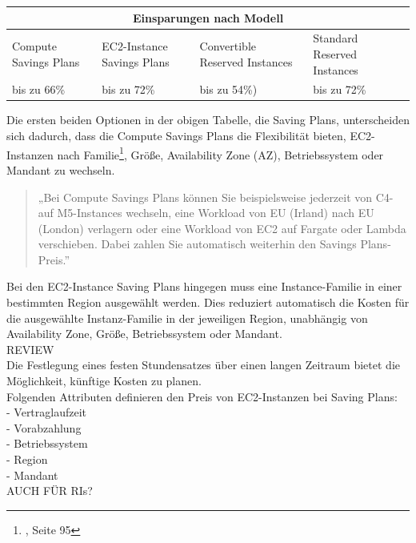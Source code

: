 \begin{table}[h!]
    \centering
    \begin{tabular}{ |p{3cm}||p{3cm}|p{3.6cm}|p{3.6cm}|  }
        \hline
        \multicolumn{4}{|c|}{Einsparungen nach Modell}                                                                    \\
        \hline
        Compute Savings Plans & EC2-Instance Savings Plans & Convertible Reserved Instances & Standard Reserved Instances \\
        \hline
        bis zu 66\%           & bis zu 72\%
                              & bis zu 54\%)               & bis zu 72\%
        \\
        \hline
    \end{tabular}
    {\cite{AMZ07,AMZ11}}
\end{table}
Die ersten beiden Optionen in der obigen Tabelle, die Saving Plans, unterscheiden sich dadurch, dass die Compute Savings Plans die Flexibilität bieten, EC2-Instanzen nach Familie\footnote{\cite{AWS1}, Seite 95}, Größe, Availability Zone (AZ), Betriebssystem oder Mandant zu wechseln.
\begin{quote}
    „Bei Compute Savings Plans können Sie beispielsweise jederzeit von C4- auf M5-Instances wechseln, eine Workload von EU (Irland) nach EU (London) verlagern oder eine Workload von EC2 auf Fargate oder Lambda verschieben. Dabei zahlen Sie automatisch weiterhin den Savings Plans-Preis.”
    {\cite{AMZ11}}
\end{quote}

Bei den EC2-Instance Saving Plans hingegen muss eine Instance-Familie in einer bestimmten Region ausgewählt werden.  Dies reduziert automatisch die Kosten für die ausgewählte Instanz-Familie in der jeweiligen Region, unabhängig von Availability Zone, Größe, Betriebssystem oder Mandant.
\\
REVIEW{
\\
Die Festlegung eines festen Stundensatzes über einen langen Zeitraum bietet die Möglichkeit, künftige Kosten zu planen.}
\\
Folgenden Attributen definieren den Preis von EC2-Instanzen bei Saving Plans:
\\
- Vertraglaufzeit
\\
- Vorabzahlung
\\
- Betriebssystem
\\
- Region
\\
- Mandant
\\
AUCH FÜR RIs?


